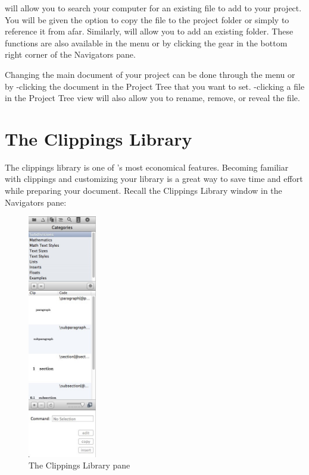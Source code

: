 
 will allow you to search your computer for an existing file to add to your project. You will be given the option to copy the file to the project folder or simply to reference it from afar. Similarly,  will allow you to add an existing folder. These functions are also available in the  menu or by clicking the gear in the bottom right corner of the Navigators pane.

Changing the main document of your project can be done through the  menu or by \cmdkey-clicking the document in the Project Tree that you want to set. \ctlkey-clicking a file in the Project Tree view will also allow you to rename, remove, or reveal the file.

\section[Clippings Library]{The Clippings Library}
\label{reference.clippings}
The clippings library is one of \texnicle's most economical features. Becoming familiar with clippings and customizing your library is a great way to save time and effort while preparing your document. Recall the Clippings Library window in the Navigators pane:
\begin{figure}[ht]
\centering
\includegraphics[width=3cm]{TeXnicle-Images/texnicle-clippingslibrary.jpg}
\caption{The Clippings Library pane}
\label{fig:texnicle-clippingslibrary2}
\end{figure}

